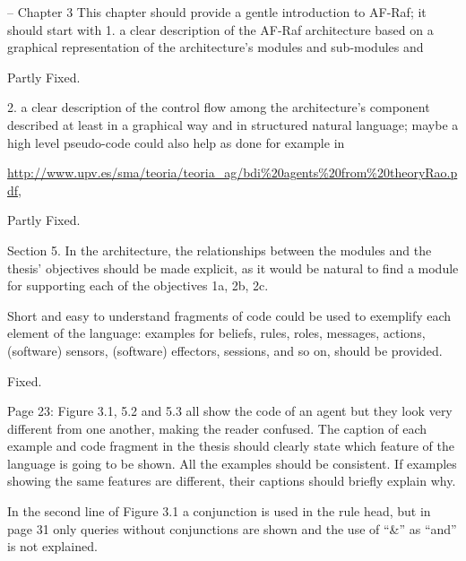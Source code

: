 \documentclass{article}
\newcommand{\todo}[1]{[\textcolor{red}{TODO}: #1]}
\newenvironment{them}{\noindent\begingroup\color{blue}}{\endgroup\par}
\begin{document}
\begin{them}

-- Chapter 3
This chapter should provide a gentle introduction to AF-Raf; it should start
with 1. a clear description of the AF-Raf architecture based on a graphical
representation of the architecture's modules and sub-modules and

\end{them}
Partly Fixed. 

\begin{them}

2. a clear description of the control flow among the architecture's component
described at least in a graphical way and in structured natural language; maybe
a high level pseudo-code could also help as done for example in

\url{http://www.upv.es/sma/teoria/teoria_ag/bdi\%20agents\%20from\%20theoryRao.pdf},
\end{them}
Partly Fixed. 

\begin{them}

Section 5.
In the architecture, the relationships between the modules and the thesis'
objectives should be made explicit, as it would be natural to find a module for
supporting each of the objectives 1a, 2b, 2c.

\end{them}
\todo{} 

\begin{them}

Short and easy to understand fragments of code could be used to exemplify each
element of the language: examples for beliefs, rules, roles, messages, actions,
(software) sensors, (software) effectors, sessions, and so on, should be
provided.

\end{them}
Fixed. 

\begin{them}

Page 23:
Figure 3.1, 5.2 and 5.3 all show the code of an agent but they look very
different from one another, making the reader confused. The caption of each
example and code fragment in the thesis should clearly state which feature of
the language is going to be shown. All the examples should be consistent. If
examples showing the same features are different, their captions should briefly
explain why.

\end{them}
\todo{} 

\begin{them}

In the second line of Figure 3.1 a conjunction is used in the rule head, but in
page 31 only queries without conjunctions are shown and the use of “\&” as
“and” is not explained.

\end{them}
\todo{} 
\end{document}
